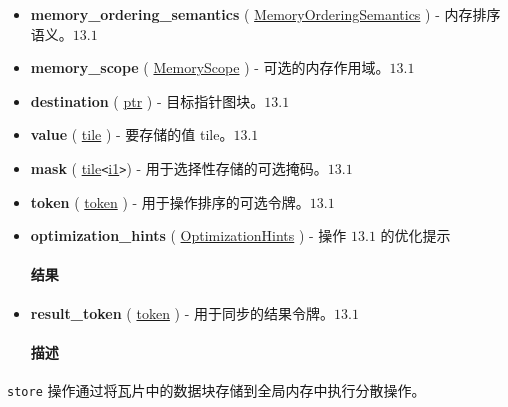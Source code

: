 \documentclass{article}
\begin{document}
\begin{itemize}
\item \textbf{memory\_ordering\_semantics} ( \href{https://docs.nvidia.com/cuda/tile-ir/latest/sections/operations.html#op-attribute-cuda-tile-store-ptr-tko-memoryorderingsemantics-attr}{MemoryOrderingSemantics} ) - 内存排序语义。$\boxed{13.1}$
\item \textbf{memory\_scope} ( \href{https://docs.nvidia.com/cuda/tile-ir/latest/sections/operations.html#op-attribute-cuda-tile-store-ptr-tko-memoryscope-attr}{MemoryScope} ) - 可选的内存作用域。$\boxed{13.1}$
\item \textbf{destination} ( \href{https://docs.nvidia.com/cuda/tile-ir/latest/sections/types.html#type-ptr}{ptr} ) - 目标指针图块。$\boxed{13.1}$
\item \textbf{value} ( \href{https://docs.nvidia.com/cuda/tile-ir/latest/sections/types.html#type-tile}{tile} ) - 要存储的值 tile。$\boxed{13.1}$
\item \textbf{mask} ( \href{https://docs.nvidia.com/cuda/tile-ir/latest/sections/types.html#type-tile}{tile}\texttt{<}\href{https://docs.nvidia.com/cuda/tile-ir/latest/sections/types.html#subsection-element-types}{i1}\texttt{>}) - 用于选择性存储的可选掩码。$\boxed{13.1}$
\item \textbf{token} ( \href{https://docs.nvidia.com/cuda/tile-ir/latest/sections/operations.html#type-token}{token} ) - 用于操作排序的可选令牌。$\boxed{13.1}$
\item \textbf{optimization\_hints} ( \href{https://docs.nvidia.com/cuda/tile-ir/latest/sections/operations.html#op-attribute-cuda-tile-store-ptr-tko-optimizationhints-attr}{OptimizationHints} ) - 操作 $\boxed{13.1}$ 的优化提示


\paragraph{结果}

\item \textbf{result\_token} ( \href{https://docs.nvidia.com/cuda/tile-ir/latest/sections/operations.html#type-token}{token} ) - 用于同步的结果令牌。$\boxed{13.1}$


\paragraph{描述}

\end{itemize}
\texttt{store} 操作通过将瓦片中的数据块存储到全局内存中执行分散操作。
\end{document}
